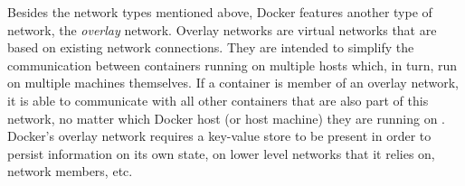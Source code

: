     Besides the network types mentioned above, Docker features another type of network, the \emph{overlay} network. Overlay networks are virtual networks that are based on existing network connections. They are intended to simplify the communication between containers running on multiple hosts which, in turn, run on multiple machines themselves. If a container is member of an overlay network, it is able to communicate with all other containers that are also part of this network, no matter which Docker host (or host machine) they are running on \cite{Docker????Dockera}. \\
    Docker's overlay network requires a key-value store to be present in order to persist information on its own state, \eg on lower level networks that it relies on, network members, etc.







